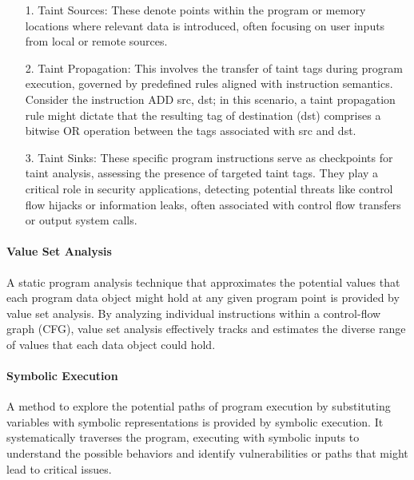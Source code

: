 \begin{enumerate}
%
  \item[1.] Taint Sources: These denote points within the program or memory
locations where relevant data is introduced, often focusing on user inputs
from local or remote sources.
%  
  \item[2.] Taint Propagation: This involves the transfer of taint tags
during program execution, governed by predefined rules aligned with
instruction semantics. Consider the instruction ADD src, dst; in this
scenario, a taint propagation rule might dictate that the resulting tag of
destination (dst) comprises a bitwise OR operation between the tags
associated with src and dst.
%  
  \item[3.] Taint Sinks: These specific program instructions serve as
checkpoints for taint analysis, assessing the presence of targeted taint
tags. They play a critical role in security applications, detecting
potential threats like control flow hijacks or information leaks, often
associated with control flow transfers or output system calls.
%  
\end{enumerate}

\paragraph{\textbf{Value Set Analysis}} A static program analysis technique
that approximates the potential values that each program data object might
hold at any given program point is provided by value set analysis. By
analyzing individual instructions within a control-flow graph (CFG), value
set analysis effectively tracks and estimates the diverse range of values
that each data object could hold. 

\paragraph{\textbf{Symbolic Execution}} A method to explore the potential
paths of program execution by substituting variables with symbolic
representations is provided by symbolic execution. It systematically
traverses the program, executing with symbolic inputs to understand the
possible behaviors and identify vulnerabilities or paths that might lead to
critical issues.

